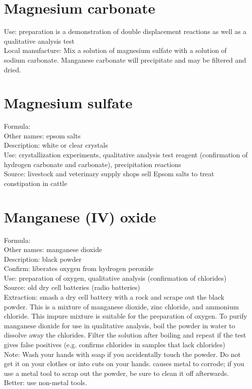 \section{Magnesium carbonate}
\label{sec:}
Use: preparation is a demonstration of double displacement reactions 
as well as a qualitative analysis test\\
Local manufacture: Mix a solution of magnesium sulfate 
with a solution of sodium carbonate. 
Manganese carbonate will precipitate and may be filtered and dried.

\section{Magnesium sulfate}
\label{sec:magsulfate}
Formula: \\
Other names: epsom salts\\
Description: white or clear crystals\\
Use: crystallization experiments, 
qualitative analysis test reagent 
(confirmation of hydrogen carbonate and carbonate), 
precipitation reactions\\
Source: livestock and veterinary supply shops sell Epsom salts 
to treat constipation in cattle

\section{Manganese (IV) oxide}
\label{sec:}
Formula: \\
Other names: manganese dioxide\\
Description: black powder\\
Confirm: liberates oxygen from hydrogen peroxide\\
Use: preparation of oxygen, 
qualitative analysis (confirmation of chlorides)\\
Source: old dry cell batteries (radio batteries)\\
Extraction: smash a dry cell battery with a rock 
and scrape out the black powder. 
This is a mixture of manganese dioxide, 
zinc chloride, 
and ammonium chloride. 
This impure mixture is suitable for the preparation of oxygen. 
To purify manganese dioxide for use in qualitative analysis, 
boil the powder in water to dissolve away the chlorides. 
Filter the solution after boiling 
and repeat if the test gives false positives (e.g. 
confirms chlorides in samples that lack chlorides)\\
Note: Wash your hands with soap if you accidentally touch the powder. 
Do not get it on your clothes or into cuts on your hands. 
 causes metal to corrode; 
if you use a metal tool to scrap out the powder, 
be sure to clean it off afterwards. 
Better: use non-metal tools. 


